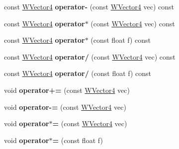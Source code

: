 \begin{DoxyCompactItemize}
\item 
const \hyperlink{class_w_vector4}{W\+Vector4} {\bfseries operator-\/} (const \hyperlink{class_w_vector4}{W\+Vector4} vec) const \hypertarget{class_w_vector4_ac173c5735eb52e5cca5c3e6b64a0b449}{}\label{class_w_vector4_ac173c5735eb52e5cca5c3e6b64a0b449}

\item 
const \hyperlink{class_w_vector4}{W\+Vector4} {\bfseries operator$\ast$} (const \hyperlink{class_w_vector4}{W\+Vector4} vec) const \hypertarget{class_w_vector4_a0f2f6121af9b7e889fc31ca24cc16c77}{}\label{class_w_vector4_a0f2f6121af9b7e889fc31ca24cc16c77}

\item 
const \hyperlink{class_w_vector4}{W\+Vector4} {\bfseries operator$\ast$} (const float f) const \hypertarget{class_w_vector4_ac9f8dd4c3d01ec25ba30d1f6d0e6c849}{}\label{class_w_vector4_ac9f8dd4c3d01ec25ba30d1f6d0e6c849}

\item 
const \hyperlink{class_w_vector4}{W\+Vector4} {\bfseries operator/} (const \hyperlink{class_w_vector4}{W\+Vector4} vec) const \hypertarget{class_w_vector4_a525190b3760389496f887faeb4f01110}{}\label{class_w_vector4_a525190b3760389496f887faeb4f01110}

\item 
const \hyperlink{class_w_vector4}{W\+Vector4} {\bfseries operator/} (const float f) const \hypertarget{class_w_vector4_a612a0c16c3e7a1f5b834bb589db40f40}{}\label{class_w_vector4_a612a0c16c3e7a1f5b834bb589db40f40}

\item 
void {\bfseries operator+=} (const \hyperlink{class_w_vector4}{W\+Vector4} vec)\hypertarget{class_w_vector4_afccb847b3e4f0ec7ad85af41fe002b48}{}\label{class_w_vector4_afccb847b3e4f0ec7ad85af41fe002b48}

\item 
void {\bfseries operator-\/=} (const \hyperlink{class_w_vector4}{W\+Vector4} vec)\hypertarget{class_w_vector4_ac8a84a12d395014dabd26c1e072173ac}{}\label{class_w_vector4_ac8a84a12d395014dabd26c1e072173ac}

\item 
void {\bfseries operator$\ast$=} (const \hyperlink{class_w_vector4}{W\+Vector4} vec)\hypertarget{class_w_vector4_a8b60b824f7a97b677316a6aa9c81b0e5}{}\label{class_w_vector4_a8b60b824f7a97b677316a6aa9c81b0e5}

\item 
void {\bfseries operator$\ast$=} (const float f)\hypertarget{class_w_vector4_ac1be0babc6d3e35a3fa5b23a851564e1}{}\label{class_w_vector4_ac1be0babc6d3e35a3fa5b23a851564e1}


\end{DoxyCompactItemize}
